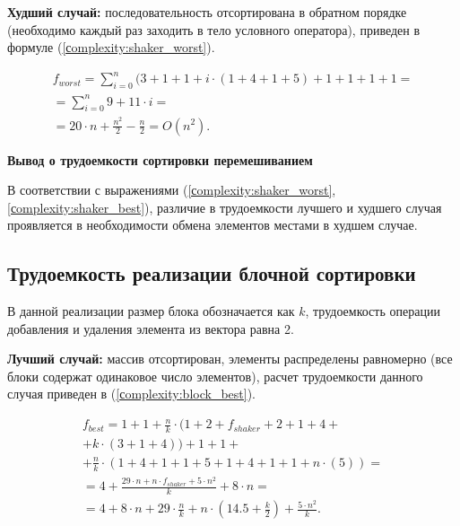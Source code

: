 \textbf{Худший случай:} последовательность отсортирована в обратном порядке (необходимо каждый раз заходить в тело условного оператора), приведен в формуле (\ref{сomplexity:shaker_worst}).

\begin{equation}
	\label{сomplexity:shaker_worst}
	\begin{gathered}
		f_{worst} = \sum_{i=0}^{n}  (3 +  1 + 1 + i \cdot (1 +4  + 1 + 5) + 1 +1 +1 +1 = \\ = \sum_{i=0}^{n} 9 + 11 \cdot i = \\
		= 20 \cdot n + \frac{n^2}{2} - \frac{n}{2} = O(n^2).
	\end{gathered}
\end{equation}


\textbf{Вывод о  трудоемкости сортировки перемешиванием}

В соответствии с выражениями (\ref{сomplexity:shaker_worst}, \ref{сomplexity:shaker_best}), различие в трудоемкости лучшего и худшего случая проявляется в необходимости обмена элементов местами в худшем случае.



\subsection{Трудоемкость реализации блочной сортировки}
В данной реализации размер блока обозначается как $k$, трудоемкость операции добавления и удаления элемента из вектора равна 2.


\textbf{Лучший случай:} массив отсортирован, элементы распределены равномерно (все блоки содержат одинаковое число элементов), расчет трудоемкости данного случая приведен в (\ref{сomplexity:block_best}).


\begin{equation}
	\label{сomplexity:block_best}
	\begin{gathered}
		f_{best} = 1 +1 + \frac{n}{k} \cdot(1 + 2+f_{shaker} + 2 + 1 + 4 + \\
		+ k \cdot (3 + 1 + 4)) + 1 + 1 + \\
		+ \frac{n}{k} \cdot (1 + 4 + 1 + 1 + 5 + 1 + 4 + 1 + 1 + n \cdot (5)) = \\
		= 4 + \frac{29\cdot n + n \cdot f_{shaker} + 5 \cdot n^2}{k}  + 8 \cdot n  = \\
		= 4 + 8 \cdot n + 29 \cdot \frac{n}{k} + n \cdot (14.5 + \frac{k}{2}) + \frac{5 \cdot n^2}{k}.
	\end{gathered}
\end{equation}




